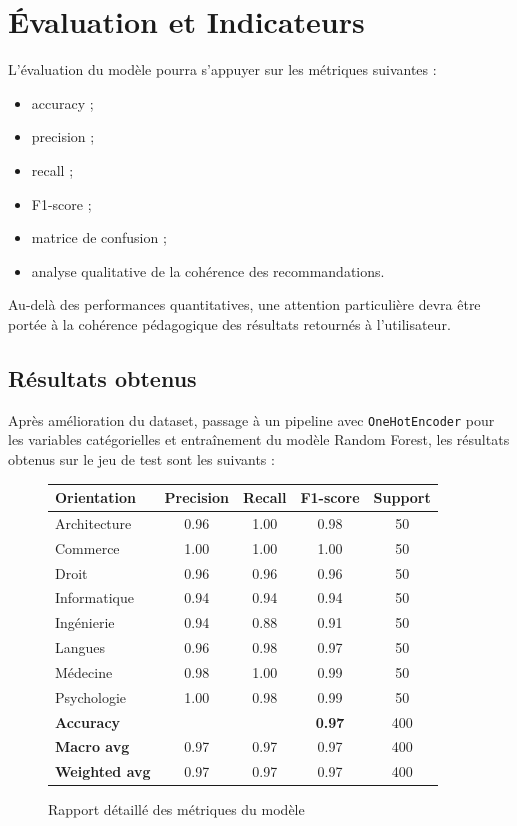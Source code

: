 \documentclass[12pt,a4paper]{report}
\begin{document}
\chapter{Évaluation et Indicateurs}

L'évaluation du modèle pourra s'appuyer sur les métriques suivantes :
\begin{itemize}[label=--]
    \item accuracy ;
    \item precision ;
    \item recall ;
    \item F1-score ;
    \item matrice de confusion ;
    \item analyse qualitative de la cohérence des recommandations.
\end{itemize}

Au-delà des performances quantitatives, une attention particulière devra être portée à la cohérence pédagogique des résultats retournés à l'utilisateur.

\section{Résultats obtenus}
Après amélioration du dataset, passage à un pipeline avec \texttt{OneHotEncoder} pour les variables catégorielles et entraînement du modèle Random Forest, les résultats obtenus sur le jeu de test sont les suivants :

\begin{figure}[H]
\centering
\begin{tcolorbox}[colback=black!3,colframe=mainblue,width=0.95\textwidth]
\centering
\renewcommand{\arraystretch}{1.25}
\begin{tabular}{lcccc}
\toprule
\textbf{Orientation} & \textbf{Precision} & \textbf{Recall} & \textbf{F1-score} & \textbf{Support} \\
\midrule
Architecture & 0.96 & 1.00 & 0.98 & 50 \\
Commerce & 1.00 & 1.00 & 1.00 & 50 \\
Droit & 0.96 & 0.96 & 0.96 & 50 \\
Informatique & 0.94 & 0.94 & 0.94 & 50 \\
Ingénierie & 0.94 & 0.88 & 0.91 & 50 \\
Langues & 0.96 & 0.98 & 0.97 & 50 \\
Médecine & 0.98 & 1.00 & 0.99 & 50 \\
Psychologie & 1.00 & 0.98 & 0.99 & 50 \\
\midrule
\textbf{Accuracy} &  &  & \textbf{0.97} & 400 \\
\textbf{Macro avg} & 0.97 & 0.97 & 0.97 & 400 \\
\textbf{Weighted avg} & 0.97 & 0.97 & 0.97 & 400 \\
\bottomrule
\end{tabular}
\end{tcolorbox}
\caption{Rapport détaillé des métriques du modèle}
\end{figure}
\end{document}
